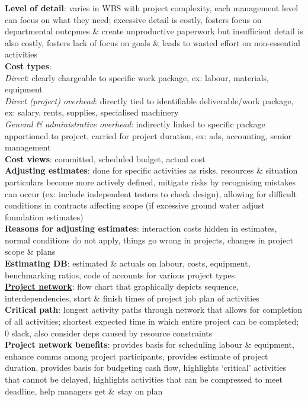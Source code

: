 \documentclass[a4paper]{article}
\begin{document}
\begin{multicols}{3}
        \textbf{Level of detail}: varies in WBS with project complexity, each management level can focus on what they need; excessive detail is costly, fosters focus on departmental outcpmes \& create unproductive paperwork but insufficient detail is also costly, fosters lack of focus on goals \& leads to wasted effort on non-essential activities\\
        \textbf{Cost types}:\\
        \textit{Direct}: clearly chargeable to specific work package, ex: labour, materials, equipment\\
        \textit{Direct (project) overhead}: directly tied to identifiable deliverable/work package, ex: salary, rents, supplies, specialised machinery\\
        \textit{General \& administrative overhead}: indirectly linked to specific package apportioned to project, carried for project duration, ex: ads, accounting, senior management\\
        \textbf{Cost views}: committed, scheduled budget, actual cost\\
        \textbf{Adjusting estimates}: done for specific activities as risks, resources \& situation particulars become more actively defined, mitigate risks by recognising mistakes can occur (ex: include independent testers to check design), allowing for difficult conditions in contracts affecting scope (if excessive ground water adjust foundation estimates)\\
        \textbf{Reasons for adjusting estimates}: interaction costs hidden in estimates, normal conditions do not apply, things go wrong in projects, changes in project scope \& plans\\
        \textbf{Estimating DB}: estimated \& actuals on labour, costs, equipment, benchmarking ratios, code of accounts for various project types\\
        \underline{\textbf{Project network}}: flow chart that graphically depicts sequence, interdependencies, start \& finish times of project job plan of activities\\
        \textbf{Critical path}: longest activity paths through network that allows for completion of all activities; shortest expected time in which entire project can be completed; 0 slack, also consider deps caused by resource constraints\\
        \textbf{Project network benefits}: provides basis for scheduling labour \& equipment, enhance comms among project participants, provides estimate of project duration, provides basis for budgeting cash flow, highlights `critical' activities that cannot be delayed, highlights activities that can be compressed to meet deadline, help managers get \& stay on plan\\

\end{multicols}
\end{document}
